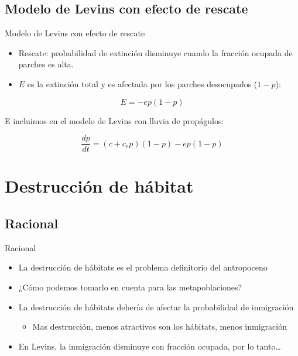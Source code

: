 \documentclass[
  11pt,
  ignorenonframetext,
]{beamer}
\providecommand{\tightlist}{%
  \setlength{\itemsep}{0pt}\setlength{\parskip}{0pt}}
\begin{document}
\hypertarget{modelo-de-levins-con-efecto-de-rescate}{%
\subsection{Modelo de Levins con efecto de
rescate}\label{modelo-de-levins-con-efecto-de-rescate}}

\begin{frame}{Modelo de Levins con efecto de rescate}
\begin{itemize}
\item
  Rescate: probabilidad de extinción disminuye cuando la fracción
  ocupada de parches es alta.
\item
  \(E\) es la extinción total y es afectada por los parches desocupados
  (\(1-p\)):
\end{itemize}

\[E = -ep(1-p)\]

E incluimos en el modelo de Levins con lluvia de propágulos:

\[\frac{dp}{dt} = (c + c_e p)(1-p) - ep(1-p)\]
\end{frame}

\hypertarget{destrucciuxf3n-de-huxe1bitat}{%
\section{Destrucción de hábitat}\label{destrucciuxf3n-de-huxe1bitat}}

\hypertarget{racional-1}{%
\subsection{Racional}\label{racional-1}}

\begin{frame}{Racional}
\begin{itemize}
\item
  La destrucción de hábitats es el problema definitorio del antropoceno
\item
  ¿Cómo podemos tomarlo en cuenta para las metapoblaciones?
\item
  La destrucción de hábitats debería de afectar la probabilidad de
  inmigración

  \begin{itemize}
  \tightlist
  \item
    Mas destrucción, menos atractivos son los hábitats, menos
    inmigración
  \end{itemize}
\item
  En Levins, la inmigración disminuye con fracción ocupada, por lo
  tanto\ldots{}
\end{itemize}
\end{frame}
\end{document}
